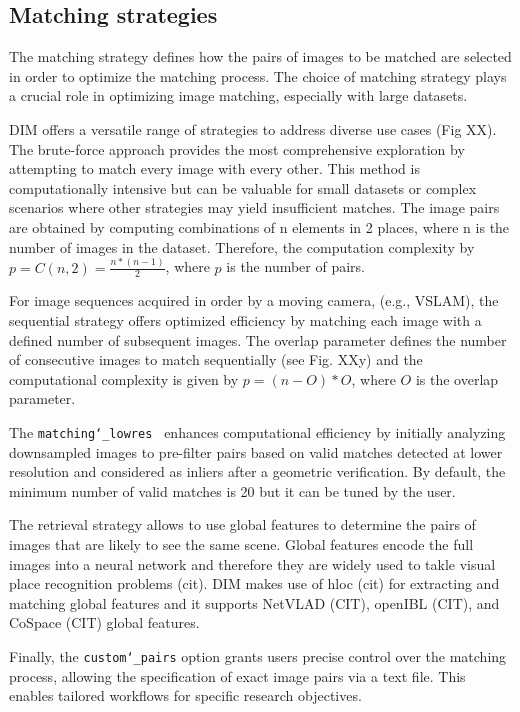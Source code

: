 \subsection{Matching strategies}

The matching strategy defines how the pairs of images to be matched are selected in order to optimize the matching process. The choice of matching strategy plays a crucial role in optimizing image matching, especially with large datasets.  

DIM offers a versatile range of strategies to address diverse use cases (Fig XX). The brute-force approach provides the most comprehensive exploration by attempting to match every image with every other. This method is computationally intensive but can be valuable for small datasets or complex scenarios where other strategies may yield insufficient matches. The image pairs are obtained by computing combinations of n elements in 2 places, where n is the number of images in the dataset. Therefore, the computation complexity by 
$ p = C(n,2) = \frac{n*\left(n-1\right)}{2}$, where $p$ is the number of pairs.

For image sequences acquired in order by a moving camera, (e.g., VSLAM), the sequential strategy offers optimized efficiency by matching each image with a defined number of subsequent images. The overlap parameter defines the number of consecutive images to match sequentially (see Fig. XXy) and the computational complexity is given by $p = \left(n-O\right) * O $, where $O$ is the overlap parameter.

The \texttt{matching\char`_lowres } enhances computational efficiency by initially analyzing downsampled images to pre-filter pairs based on valid matches detected at lower resolution and considered as inliers after a geometric verification. By default, the minimum number of valid matches is 20 but it can be tuned by the user. 

The retrieval strategy allows to use global features to determine the pairs of images that are likely to see the same scene. Global features encode the full images into a neural network and therefore they are widely used to takle visual place recognition problems (cit). DIM makes use of hloc (cit) for extracting and matching global features and it supports NetVLAD (CIT), openIBL (CIT), and CoSpace (CIT) global features.  

Finally, the \texttt{custom\char`_pairs} option grants users precise control over the matching process, allowing the specification of exact image pairs via a text file. This enables tailored workflows for specific research objectives. 


